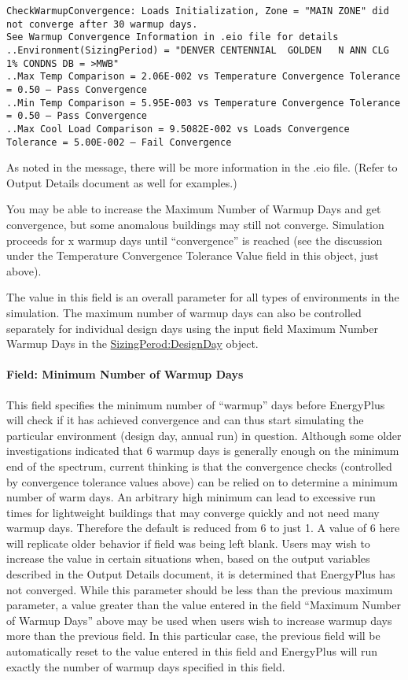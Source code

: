 \begin{lstlisting}
CheckWarmupConvergence: Loads Initialization, Zone = "MAIN ZONE" did not converge after 30 warmup days.
See Warmup Convergence Information in .eio file for details
..Environment(SizingPeriod) = "DENVER CENTENNIAL  GOLDEN   N ANN CLG 1% CONDNS DB = >MWB"
..Max Temp Comparison = 2.06E-002 vs Temperature Convergence Tolerance = 0.50 – Pass Convergence
..Min Temp Comparison = 5.95E-003 vs Temperature Convergence Tolerance = 0.50 – Pass Convergence
..Max Cool Load Comparison = 9.5082E-002 vs Loads Convergence Tolerance = 5.00E-002 – Fail Convergence
\end{lstlisting}

As noted in the message, there will be more information in the .eio file. (Refer to Output Details document as well for examples.)

You may be able to increase the Maximum Number of Warmup Days and get convergence, but some anomalous buildings may still not converge. Simulation proceeds for x warmup days until ``convergence'' is reached (see the discussion under the Temperature Convergence Tolerance Value field in this object, just above).

The value in this field is an overall parameter for all types of environments in the simulation. The maximum number of warmup days can also be controlled separately for individual design days using the input field Maximum Number Warmup Days in the \hyperref[sizingperioddesignday]{SizingPerod:DesignDay} object.

\paragraph{Field: Minimum Number of Warmup Days}\label{field-minimum-number-of-warmup-days}

This field specifies the minimum number of ``warmup'' days before EnergyPlus will check if it has achieved convergence and can thus start simulating the particular environment (design day, annual run) in question. Although some older investigations indicated that 6 warmup days is generally enough on the minimum end of the spectrum, current thinking is that the convergence checks (controlled by convergence tolerance values above) can be relied on to determine a minimum number of warm days. An arbitrary high minimum can lead to excessive run times for lightweight buildings that may converge quickly and not need many warmup days. Therefore the default is reduced from 6 to just 1. A value of 6 here will replicate older behavior if field was being left blank. Users may wish to increase the value in certain situations when, based on the output variables described in the Output Details document, it is determined that EnergyPlus has not converged. While this parameter should be less than the previous maximum parameter, a value greater than the value entered in the field ``Maximum Number of Warmup Days'' above may be used when users wish to increase warmup days more than the previous field. In this particular case, the previous field will be automatically reset to the value entered in this field and EnergyPlus will run exactly the number of warmup days specified in this field.

